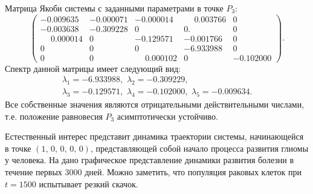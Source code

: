 \documentclass[14pt,a4paper]{extarticle}
\begin{document}
\begin{example}
		Матрица Якоби системы с заданными параметрами в точке $P_3$: 
		\[\begin{pmatrix}
			-0.009635&-0.000071&-0.000014& \phantom{-}0.003766&0\\
			-0.003638&-0.309228& 0       & 0.      & 0\\
			\phantom{-}0.000014& 0   &    -0.129571&-0.001766& 0\\
			0       & 0     &   0     &  -6.933988& 0\\
			0       & 0&\phantom{-}0.000102& 0   &   -0.102000 
		\end{pmatrix}.\]
		Спектр данной матрицы имеет следующий вид:
		\begin{multline*}
			\lambda_1=-6.933988,\,\, \lambda_2=-0.309229,\\
			\lambda_3=-0.129571,\,\, \lambda_4=-0.102000,\,\, \lambda_5=-0.009634.
		\end{multline*}
		Все собственные значения являются отрицательными действительными числами, т.е. положение равновесия $P_3$ асимптотически устойчиво.
		
		Естественный интерес представит динамика траектории системы, начинающейся в точке $\left(1,\,0,\,0,\,0,\,0\right)$, представляющей собой начало процесса развития глиомы у человека. На  дано графическое представление динамики развития болезни в течение первых 3000 дней. Можно заметить, что популяция раковых клеток при $t=1500$ испытывает резкий скачок.
		

\end{example}
\end{document}
